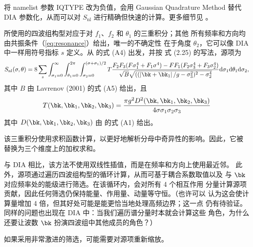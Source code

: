 
\noindent
将 namelist 参数 IQTYPE 改为负值，会用 Gaussian Quadrature Method
\cite{Lavrenov2001} 替代 DIA 参数化，从而可以对 $S_{\mathrm{nl}}$
进行精确但快速的计算。更多细节见 \cite{Gagnaire-Renou2009}。


所使用的四波组构型对应于对 $f_1$、$f_2$ 和 $\theta_1$ 的三重积分；其他
所有频率和方向均由共振条件（\ref{eq:resonance}）给出，唯一的不确定性
在于角度 $\theta_2$，它可以像 DIA 中一样用符号指标 $s$ 定义。从
\cite{Lavrenov2001} 的式 (A4) 出发，并按 \cite{Gagnaire-Renou2009}
式 (2.25) 的写法，源项为
\begin{equation}
S_{\mathrm{nl}}(\sigma,\theta) =  8 \sum_s \int_{\sigma_1=0}^\infty \int_{\theta_1=0}^{2 \pi} \int_{\sigma_2=0}^{(\sigma+\sigma_1)/2}  T  \frac{F_2 F_3 (F \sigma_1^4 + F_1 \sigma^4) - F F_1 (F_2 \sigma_3^4 + F_3 \sigma_2^4)}{\sqrt{B}\sqrt{((\left| \bk+\bk_1 \right|/g- \sigma_3^2)^2-\sigma_2^4} } {\mathrm d}\sigma_1 {\mathrm d}\theta_1 {\mathrm d}\sigma_2 ,
      \label{eq:snl_gqm}
\end{equation}
其中 $B$ 由 Lavrenov (2001) 的式 (A5) 给出，且
\begin{equation}
T(\bk,\bk_1,\bk_2,\bk_3) = \frac{\pi g^2 D^2(\bk,\bk_1,\bk_2,\bk_3) }{4 \sigma \sigma_1 \sigma_2 \sigma_3}
\end{equation}
其中 $D(\bk,\bk_1,\bk_2,\bk_3)$ 由 \cite{Webb1978} 的式 (A1) 给出。

该三重积分使用求积函数计算，以更好地解析分母中奇异性的影响。因此，它被
替换为三个维度上的加权求和。

与 DIA 相比，该方法不使用双线性插值，而是在频率和方向上使用最近邻。
此外，源项通过遍历四波组构型的循环计算，从而可基于耦合系数取值以及
与 $\bk$ 对应频率处的能级进行筛选。在该循环内，会对所有 4 个相互作用
分量计算源项贡献，因此任何筛选仍保持能量、作用量、动量等守恒。（也许可以
认为这会使计算量增加 4 倍，但其好处可能是能更恰当地处理高频边界；这一点
仍有待验证。同样的问题也出现在 DIA 中：当我们遍历谱分量时本就会计算这些
角色，为什么还要让波数 $\bk$ 扮演四波组中其他成员的角色？）

如果采用非常激进的筛选，可能需要对源项重新缩放。

